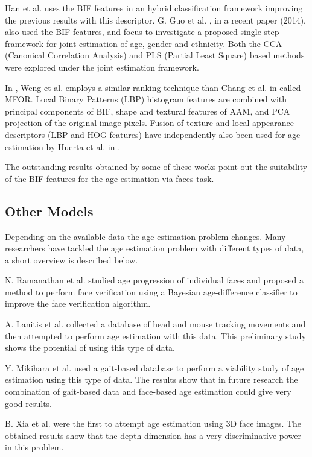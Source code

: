 Han et al. \cite{han:age} uses the BIF features in an hybrid classification framework improving the previous results with this descriptor. G. Guo et al. \cite{Guo2014761}, in a recent paper (2014), also used the BIF features, and focus to investigate a proposed single-step framework for joint estimation of age, gender and ethnicity. Both the CCA (Canonical Correlation Analysis) \cite{hotelling1936relations} and PLS (Partial Least Square) based methods were explored under the joint estimation framework.

In \cite{6553772}, Weng et al. employs a similar ranking technique than Chang et al. in \cite{5995437} called MFOR. Local Binary Patterns (LBP) histogram features are combined with principal components of BIF, shape and textural features of AAM, and PCA projection of the original image pixels. Fusion of texture and local appearance descriptors (LBP and HOG features) have independently also been used for age estimation by Huerta et al. in \cite{HuFerPra14}.

The outstanding results obtained by some of these works point out the suitability of the BIF features for the age estimation via faces task.

\subsection{Other Models}

Depending on the available data the age estimation problem changes. Many researchers have tackled the age estimation problem with different types of data, a short overview is described below.

N. Ramanathan et al. \cite{1709980} studied age progression of individual faces and proposed a method to perform face verification using a Bayesian age-difference classifier to improve the face verification algorithm.

A. Lanitis et al. \cite{5463396} collected a database of head and mouse tracking movements and then attempted to perform age estimation with this data. This preliminary study shows the potential of using this type of data.

Y. Mikihara et al. \cite{6117531} used a gait-based database to perform a viability study of age estimation using this type of data. The results show that in future research the combination of gait-based data and face-based age estimation could give very good results.

B. Xia et al. \cite{xia:hal-00904007} were the first to attempt age estimation using 3D face images. The obtained results show that the depth dimension has a very discriminative power in this problem. 

